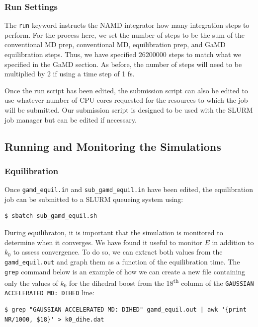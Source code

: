 \documentclass[9pt,tutorial]{livecoms}
\begin{document}
\subsubsection{Run Settings}
The \texttt{run} keyword instructs the NAMD integrator how many integration steps to perform. For the process here, we set the number of steps to be the sum of the conventional MD prep, conventional MD, equilibration prep, and GaMD equilibration steps. Thus, we have specified 26200000 steps to match what we specified in the GaMD section. As before, the number of steps will need to be multiplied by 2 if using a time step of 1 fs. 

Once the run script has been edited, the submission script can also be edited to use whatever number of CPU cores requested for the resources to which the job will be submitted. Our submission script is designed to be used with the SLURM job manager but can be edited if necessary.

\subsection{Running and Monitoring the Simulations}
\subsubsection{Equilibration} \label{ss:tutorial_equil}
Once \texttt{gamd\_equil.in} and \texttt{sub\_gamd\_equil.in} have been edited, the equilibration job can be submitted to a SLURM queueing system using:

\begin{lstlisting}[style=MyBash]
$ sbatch sub_gamd_equil.sh
\end{lstlisting}

During equilibraton, it is important that the simulation is monitored to determine when it converges. We have found it useful to monitor $E$ in addition to $k_{0}$ to assess convergence. To do so, we can extract both values from the \texttt{gamd\_equil.out} and graph them as a function of the equilibration time. The \texttt{grep} command below is an example of how we can create a new file containing only the values of $k_{0}$ for the dihedral boost from the 18\textsuperscript{th} column of the \texttt{GAUSSIAN ACCELERATED MD: DIHED} line: 

\begin{lstlisting}[style=MyBash]
$ grep "GAUSSIAN ACCELERATED MD: DIHED" gamd_equil.out | awk '{print NR/1000, $18}' > k0_dihe.dat
\end{lstlisting}
\end{document}
